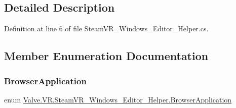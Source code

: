 \subsection{Detailed Description}


Definition at line 6 of file Steam\+V\+R\+\_\+\+Windows\+\_\+\+Editor\+\_\+\+Helper.\+cs.



\subsection{Member Enumeration Documentation}
\mbox{\label{class_valve_1_1_v_r_1_1_steam_v_r___windows___editor___helper_adfefbc734f0accaba87a104ad1a88715}} 
\subsubsection{\texorpdfstring{BrowserApplication}{BrowserApplication}}
{\footnotesize\ttfamily enum \mbox{\hyperlink{class_valve_1_1_v_r_1_1_steam_v_r___windows___editor___helper_adfefbc734f0accaba87a104ad1a88715}{Valve.\+V\+R.\+Steam\+V\+R\+\_\+\+Windows\+\_\+\+Editor\+\_\+\+Helper.\+Browser\+Application}}\hspace{0.3cm}{\ttfamily [strong]}}

